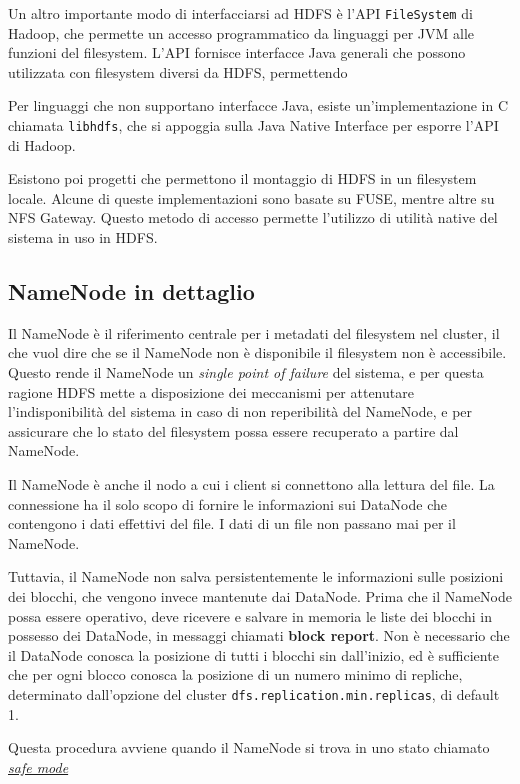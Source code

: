 \documentclass[italian,a4paper, twoside, 12pt]{report}
\begin{document}
Un altro importante modo di interfacciarsi ad HDFS è l'API
\lstinline!FileSystem! di Hadoop, che permette un accesso programmatico
da linguaggi per JVM alle funzioni del filesystem. L'API fornisce
interfacce Java generali che possono utilizzata con filesystem diversi
da HDFS, permettendo

Per linguaggi che non supportano interfacce Java, esiste
un'implementazione in C chiamata \lstinline!libhdfs!, che si appoggia
sulla Java Native Interface per esporre l'API di Hadoop.

Esistono poi progetti che permettono il montaggio di HDFS in un
filesystem locale. Alcune di queste implementazioni sono basate su FUSE,
mentre altre su NFS Gateway. Questo metodo di accesso permette
l'utilizzo di utilità native del sistema in uso in HDFS.

\subsection{NameNode in dettaglio}\label{namenode-in-dettaglio}

Il NameNode è il riferimento centrale per i metadati del filesystem nel
cluster, il che vuol dire che se il NameNode non è disponibile il
filesystem non è accessibile. Questo rende il NameNode un \emph{single
point of failure} del sistema, e per questa ragione HDFS mette a
disposizione dei meccanismi per attenutare l'indisponibilità del sistema
in caso di non reperibilità del NameNode, e per assicurare che lo stato
del filesystem possa essere recuperato a partire dal NameNode.

Il NameNode è anche il nodo a cui i client si connettono alla lettura
del file. La connessione ha il solo scopo di fornire le informazioni sui
DataNode che contengono i dati effettivi del file. I dati di un file non
passano mai per il NameNode.

Tuttavia, il NameNode non salva persistentemente le informazioni sulle
posizioni dei blocchi, che vengono invece mantenute dai DataNode. Prima
che il NameNode possa essere operativo, deve ricevere e salvare in
memoria le liste dei blocchi in possesso dei DataNode, in messaggi
chiamati \textbf{block report}. Non è necessario che il DataNode conosca
la posizione di tutti i blocchi sin dall'inizio, ed è sufficiente che
per ogni blocco conosca la posizione di un numero minimo di repliche,
determinato dall'opzione del cluster
\lstinline!dfs.replication.min.replicas!, di default 1.

Questa procedura avviene quando il NameNode si trova in uno stato
chiamato \protect\hyperlink{safe-mode}{\emph{safe mode}}
\end{document}
